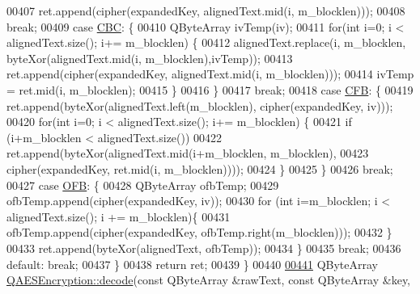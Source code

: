 \begin{DoxyCode}
00407             ret.append(cipher(expandedKey, alignedText.mid(i, m\_blocklen)));
00408         \textcolor{keywordflow}{break};
00409     \textcolor{keywordflow}{case} \hyperlink{class_q_a_e_s_encryption_ad3e031c49a3d56566379d75b40b7b255a559bffc55d3599d0a172cc85aed98966}{CBC}: \{
00410             QByteArray ivTemp(iv);
00411             \textcolor{keywordflow}{for}(\textcolor{keywordtype}{int} i=0; i < alignedText.size(); i+= m\_blocklen) \{
00412                 alignedText.replace(i, m\_blocklen, byteXor(alignedText.mid(i, m\_blocklen),ivTemp));
00413                 ret.append(cipher(expandedKey, alignedText.mid(i, m\_blocklen)));
00414                 ivTemp = ret.mid(i, m\_blocklen);
00415             \}
00416         \}
00417         \textcolor{keywordflow}{break};
00418     \textcolor{keywordflow}{case} \hyperlink{class_q_a_e_s_encryption_ad3e031c49a3d56566379d75b40b7b255ae5e2e019df35c7d172fcd7f0ebec5e8e}{CFB}: \{
00419             ret.append(byteXor(alignedText.left(m\_blocklen), cipher(expandedKey, iv)));
00420             \textcolor{keywordflow}{for}(\textcolor{keywordtype}{int} i=0; i < alignedText.size(); i+= m\_blocklen) \{
00421                 \textcolor{keywordflow}{if} (i+m\_blocklen < alignedText.size())
00422                     ret.append(byteXor(alignedText.mid(i+m\_blocklen, m\_blocklen),
00423                                        cipher(expandedKey, ret.mid(i, m\_blocklen))));
00424             \}
00425         \}
00426         \textcolor{keywordflow}{break};
00427     \textcolor{keywordflow}{case} \hyperlink{class_q_a_e_s_encryption_ad3e031c49a3d56566379d75b40b7b255a27e2f82decd94080893d61db4a8adcb3}{OFB}: \{
00428             QByteArray ofbTemp;
00429             ofbTemp.append(cipher(expandedKey, iv));
00430             \textcolor{keywordflow}{for} (\textcolor{keywordtype}{int} i=m\_blocklen; i < alignedText.size(); i += m\_blocklen)\{
00431                 ofbTemp.append(cipher(expandedKey, ofbTemp.right(m\_blocklen)));
00432             \}
00433             ret.append(byteXor(alignedText, ofbTemp));
00434         \}
00435         \textcolor{keywordflow}{break};
00436     \textcolor{keywordflow}{default}: \textcolor{keywordflow}{break};
00437     \}
00438     \textcolor{keywordflow}{return} ret;
00439 \}
00440 
\hypertarget{qaesencryption_8cpp_source.tex_l00441}{}\hyperlink{class_q_a_e_s_encryption_a58f972f2b66c2454edd5112495463bba}{00441} QByteArray \hyperlink{class_q_a_e_s_encryption_a58f972f2b66c2454edd5112495463bba}{QAESEncryption::decode}(\textcolor{keyword}{const} QByteArray &rawText, \textcolor{keyword}{const} QByteArray &key, \textcolor{keyword}{
}
\end{DoxyCode}
